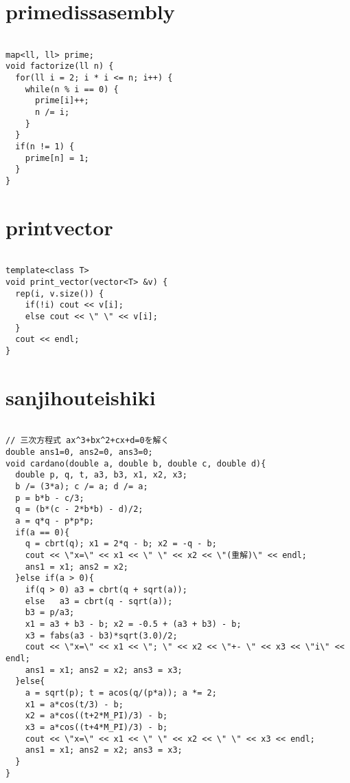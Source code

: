 \documentclass[a4j,titlepage]{jarticle} %
\begin{document}
\color{white}
\section{primedissasembly}
\color{black}
\begin{lstlisting}[caption=primedissasembly]

map<ll, ll> prime;
void factorize(ll n) {
  for(ll i = 2; i * i <= n; i++) {
    while(n % i == 0) {
      prime[i]++;
      n /= i;
    }
  }
  if(n != 1) {
    prime[n] = 1;
  }
}

\end{lstlisting}

\color{white}
\section{printvector}
\color{black}
\begin{lstlisting}[caption=printvector]

template<class T>
void print_vector(vector<T> &v) {
  rep(i, v.size()) {
    if(!i) cout << v[i];
    else cout << \" \" << v[i];
  }
  cout << endl;
}

\end{lstlisting}

\color{white}
\section{sanjihouteishiki}
\color{black}
\begin{lstlisting}[caption=sanjihouteishiki]

// 三次方程式 ax^3+bx^2+cx+d=0を解く 
double ans1=0, ans2=0, ans3=0;
void cardano(double a, double b, double c, double d){
  double p, q, t, a3, b3, x1, x2, x3;
  b /= (3*a); c /= a; d /= a;
  p = b*b - c/3;
  q = (b*(c - 2*b*b) - d)/2;
  a = q*q - p*p*p;
  if(a == 0){
    q = cbrt(q); x1 = 2*q - b; x2 = -q - b;
    cout << \"x=\" << x1 << \" \" << x2 << \"(重解)\" << endl;
    ans1 = x1; ans2 = x2;
  }else if(a > 0){
    if(q > 0) a3 = cbrt(q + sqrt(a));
    else   a3 = cbrt(q - sqrt(a));
    b3 = p/a3;
    x1 = a3 + b3 - b; x2 = -0.5 + (a3 + b3) - b;
    x3 = fabs(a3 - b3)*sqrt(3.0)/2;
    cout << \"x=\" << x1 << \"; \" << x2 << \"+- \" << x3 << \"i\" << endl;
    ans1 = x1; ans2 = x2; ans3 = x3;
  }else{
    a = sqrt(p); t = acos(q/(p*a)); a *= 2;
    x1 = a*cos(t/3) - b;
    x2 = a*cos((t+2*M_PI)/3) - b;
    x3 = a*cos((t+4*M_PI)/3) - b;
    cout << \"x=\" << x1 << \" \" << x2 << \" \" << x3 << endl;
    ans1 = x1; ans2 = x2; ans3 = x3;
  }
}

\end{lstlisting}
\end{document}
